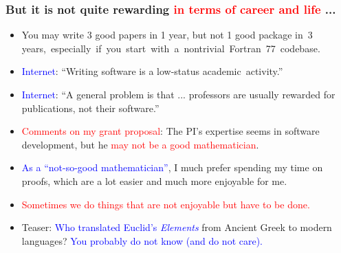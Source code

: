 \documentclass[slidestop,mathserif,xcolor=dvipsnames]{beamer}
\newcommand{\blue}[1]{\textcolor{blue}{#1}}
\newcommand{\red}[1]{\textcolor{red}{#1}}
\begin{document}
\begin{frame}
    \frametitle{But it is not quite rewarding \red{in terms of career  and life} ...}

    \begin{itemize}
        \item You may write 3 good papers in 1 year, but not 1 good package in~3 years,~especially~if~you~start~with~a~nontrivial~Fortran~77~codebase.
            \vspace{1ex}
        \item \blue{Internet}: ``Writing software is a low-status academic~activity.''
            \vspace{1ex}
        \item \blue{Internet}: ``A general problem is that ... professors are usually rewarded for publications, not their software.''
           \vspace{1ex}
       \item \red{Comments on my grant proposal}: The PI's expertise seems in software development,
           but he \red{may not be a good mathematician}.
           \vspace{1ex}
       \item \blue{As a ``not-so-good mathematician''}, I much prefer spending my time on
           proofs, which are a lot easier and much more enjoyable for me.
    \vspace{1ex}
\item \red{Sometimes we do things that are not enjoyable but have to be done.}

    \vspace{1ex}
\item Teaser: \blue{Who translated Euclid's \textit{Elements}} from Ancient Greek to modern
    languages? \blue{You probably do not know (and do not care).}
    \end{itemize}

\end{frame}
\end{document}

